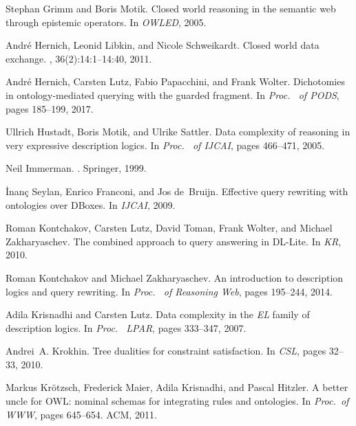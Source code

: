 \documentclass{lmcs}
\theoremstyle{definition}
\begin{document}
\begin{thebibliography}{10}
Stephan Grimm and Boris Motik.
\newblock Closed world reasoning in the semantic web through epistemic
  operators.
\newblock In {\em OWLED}, 2005.

Andr{\'{e}} Hernich, Leonid Libkin, and Nicole Schweikardt.
\newblock Closed world data exchange.
, 36(2):14:1--14:40, 2011.

Andr{\'{e}} Hernich, Carsten Lutz, Fabio Papacchini, and Frank Wolter.
\newblock Dichotomies in ontology-mediated querying with the guarded fragment.
\newblock In {\em Proc. \ of {PODS}}, pages 185--199, 2017.

Ullrich Hustadt, Boris Motik, and Ulrike Sattler.
\newblock Data complexity of reasoning in very expressive description logics.
\newblock In {\em Proc. \ of {IJCAI}}, pages 466--471, 2005.

Neil Immerman.
.
\newblock Springer, 1999.

\.{I}nan\c{c} Seylan, Enrico Franconi, and Jos de~Bruijn.
\newblock Effective query rewriting with ontologies over {DB}oxes.
\newblock In {\em IJCAI}, 2009.

Roman Kontchakov, Carsten Lutz, David Toman, Frank Wolter, and Michael
  Zakharyaschev.
\newblock The combined approach to query answering in {D}{L}-{L}ite.
\newblock In {\em KR}, 2010.

Roman Kontchakov and Michael Zakharyaschev.
\newblock An introduction to description logics and query rewriting.
\newblock In {\em Proc. \ of Reasoning Web}, pages 195--244, 2014.

Adila Krisnadhi and Carsten Lutz.
\newblock Data complexity in the \emph{EL} family of description logics.
\newblock In {\em Proc. \ {LPAR}}, pages 333--347, 2007.

Andrei~A. Krokhin.
\newblock Tree dualities for constraint satisfaction.
\newblock In {\em CSL}, pages 32--33, 2010.

Markus Kr{\"{o}}tzsch, Frederick Maier, Adila Krisnadhi, and Pascal Hitzler.
\newblock A better uncle for {OWL:} nominal schemas for integrating rules and
  ontologies.
\newblock In {\em Proc.\ of {WWW}}, pages 645--654. {ACM}, 2011.


\end{thebibliography}
\end{document}
